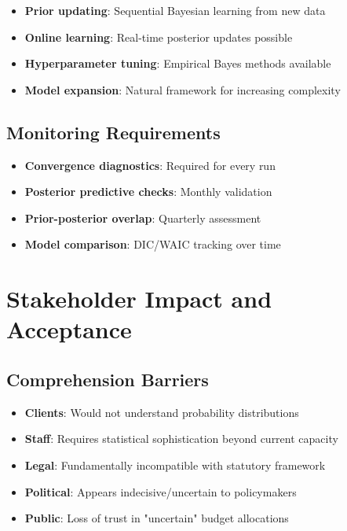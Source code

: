 \begin{itemize}
    \item \textbf{Prior updating}: Sequential Bayesian learning from new data
    \item \textbf{Online learning}: Real-time posterior updates possible
    \item \textbf{Hyperparameter tuning}: Empirical Bayes methods available
    \item \textbf{Model expansion}: Natural framework for increasing complexity
\end{itemize}

\subsection{Monitoring Requirements}

\begin{itemize}
    \item \textbf{Convergence diagnostics}: Required for every run
    \item \textbf{Posterior predictive checks}: Monthly validation
    \item \textbf{Prior-posterior overlap}: Quarterly assessment
    \item \textbf{Model comparison}: DIC/WAIC tracking over time
\end{itemize}

\section{Stakeholder Impact and Acceptance}

\subsection{Comprehension Barriers}

\begin{itemize}
    \item \textbf{Clients}: Would not understand probability distributions
    \item \textbf{Staff}: Requires statistical sophistication beyond current capacity
    \item \textbf{Legal}: Fundamentally incompatible with statutory framework
    \item \textbf{Political}: Appears indecisive/uncertain to policymakers
    \item \textbf{Public}: Loss of trust in "uncertain" budget allocations
\end{itemize}

